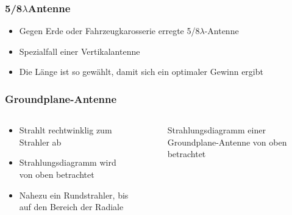 \begin{frame}
\frametitle{5/8$\lambda$Antenne}
\begin{itemize}
  \item Gegen Erde oder Fahrzeugkarosserie erregte 5/8$\lambda$-Antenne
  \item Spezialfall einer Vertikalantenne
  \item Die Länge ist so gewählt, damit sich ein optimaler Gewinn ergibt
  \end{itemize}
\end{frame}

\begin{frame}
\end{frame}

\begin{frame}
\frametitle{Groundplane-Antenne}
\begin{columns}
    \begin{column}{0.48\textwidth}
    \begin{itemize}
  \item Strahlt rechtwinklig zum Strahler ab
  \item Strahlungsdiagramm wird von oben betrachtet
  \item Nahezu ein Rundstrahler, bis auf den Bereich der Radiale
  \end{itemize}

    \end{column}
   \begin{column}{0.48\textwidth}
       
\begin{figure}
    \caption{\scriptsize Strahlungsdiagramm einer Groundplane-Antenne von oben betrachtet}
    \label{e_antennenformen_strahlungsdiagramm_groundplane}
\end{figure}


   \end{column}
\end{columns}

\end{frame}

